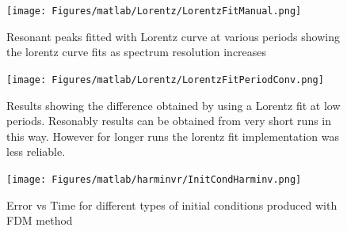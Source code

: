 \begin{figure}
\texttt{[image: Figures/matlab/Lorentz/LorentzFitManual.png]}
\caption{Resonant peaks fitted with Lorentz curve at various periods showing the lorentz curve fits as spectrum resolution increases}
\label{LorentzFit1}
\end{figure}

\begin{figure}
\texttt{[image: Figures/matlab/Lorentz/LorentzFitPeriodConv.png]}
\caption{Results showing the difference obtained by using a Lorentz fit at low periods. Resonably results can be obtained from very short runs in this way. However for longer runs the lorentz fit implementation was less reliable.}
\label{LorentzFit2}
\end{figure}


\begin{figure}
\texttt{[image: Figures/matlab/harminvr/InitCondHarminv.png]}
\caption{Error vs Time for different types of initial conditions produced with FDM method}
\label{InitCond1}
\end{figure}




